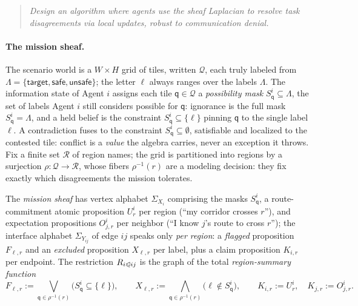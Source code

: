 \documentclass[10pt]{article}
\newif\ifshowcomments
\newcommand{\face}{\trianglelefteqslant}
\newcommand{\tile}{\mathsf{q}}
\theoremstyle{definition}
\theoremstyle{remark}
\newcommand{\prompt}[1]{%
    \begin{quote}
        \centering\itshape #1
    \end{quote}%
}
\newcommand{\ai}[1]{%
    \ifshowcomments
        \noindent\textcolor{techred}{[AI Agent]: #1}%
    \fi
}
\begin{document}
\prompt{Design an algorithm where agents use the sheaf Laplacian to resolve task disagreements via local updates, robust to communication denial.}

\paragraph{The mission sheaf.}
The scenario world is a $W \times H$ grid of tiles, written $\mathcal{Q}$, each truly labeled from $\Lambda = \{\mathsf{target}, \mathsf{safe}, \mathsf{unsafe}\}$; the letter $\ell$ always ranges over the labels $\Lambda$.
The information state of Agent $i$ assigns each tile $\tile \in \mathcal{Q}$ a \emph{possibility mask} $S^i_\tile \subseteq \Lambda$, the set of labels Agent $i$ still considers possible for $\tile$: ignorance is the full mask $S^i_\tile = \Lambda$, and a held belief is the constraint $S^i_\tile \subseteq \{\ell\}$ pinning $\tile$ to the single label $\ell$.
A contradiction fuses to the constraint $S^i_\tile \subseteq \emptyset$, satisfiable and localized to the contested tile: conflict is a \emph{value} the algebra carries, never an exception it throws. Fix a finite set $\mathcal{R}$ of region names; the grid is partitioned into regions by a surjection $\rho \colon \mathcal{Q} \to \mathcal{R}$, whose fibers $\rho^{-1}(r)$ are a modeling decision: they fix exactly which disagreements the mission tolerates.
\ai{On the fonts: I agree, and made both calligraphic ($\mathcal{Q}$, $\mathcal{R}$) rather than both roman, because a roman $R$ would collide with the relations $R$ of \Cref{sec:embeddings}. Flip both to roman with different letters if you prefer.}
The \emph{mission sheaf} has vertex alphabet $\Sigma_{X_i}$ comprising the masks $S^i_\tile$, a route-commitment atomic proposition $U^i_r$ per region (``my corridor crosses $r$''), and expectation propositions $O^i_{j,r}$ per neighbor (``I know $j$'s route to cross $r$''); the interface alphabet $\Sigma_{Y_{ij}}$ of edge $ij$ speaks only \emph{per region}: a \emph{flagged} proposition $F_{\ell,r}$ and an \emph{excluded} proposition $X_{\ell,r}$ per label, plus a claim proposition $K_{i,r}$ per endpoint. The restriction $R_{i \face ij}$ is the graph of the total \emph{region-summary function}
\begin{equation}
\label{eq:summary}
F_{\ell,r} := \bigvee_{\tile \in \rho^{-1}(r)} \bigl(S^i_\tile \subseteq \{\ell\}\bigr),
\qquad
X_{\ell,r} := \bigwedge_{\tile \in \rho^{-1}(r)} \bigl(\ell \notin S^i_\tile\bigr),
\qquad
K_{i,r} := U^i_r,
\quad
K_{j,r} := O^i_{j,r}.
\end{equation}
\end{document}
